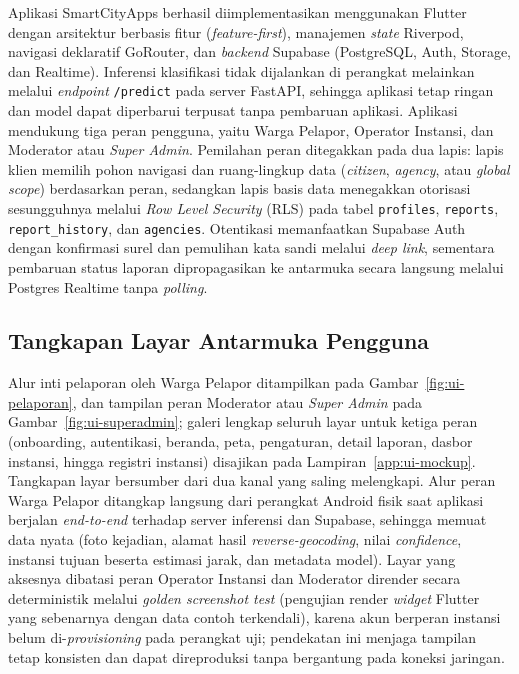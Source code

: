Aplikasi SmartCityApps berhasil diimplementasikan menggunakan Flutter dengan arsitektur berbasis fitur (\textit{feature-first}), manajemen \textit{state} Riverpod, navigasi deklaratif GoRouter, dan \textit{backend} Supabase (PostgreSQL, Auth, Storage, dan Realtime). Inferensi klasifikasi tidak dijalankan di perangkat melainkan melalui \textit{endpoint} \texttt{/predict} pada server FastAPI, sehingga aplikasi tetap ringan dan model dapat diperbarui terpusat tanpa pembaruan aplikasi. Aplikasi mendukung tiga peran pengguna, yaitu Warga Pelapor, Operator Instansi, dan Moderator atau \textit{Super Admin}. Pemilahan peran ditegakkan pada dua lapis: lapis klien memilih pohon navigasi dan ruang-lingkup data (\textit{citizen}, \textit{agency}, atau \textit{global scope}) berdasarkan peran, sedangkan lapis basis data menegakkan otorisasi sesungguhnya melalui \textit{Row Level Security} (RLS) pada tabel \texttt{profiles}, \texttt{reports}, \texttt{report\_history}, dan \texttt{agencies}. Otentikasi memanfaatkan Supabase Auth dengan konfirmasi surel dan pemulihan kata sandi melalui \textit{deep link}, sementara pembaruan status laporan dipropagasikan ke antarmuka secara langsung melalui Postgres Realtime tanpa \textit{polling}.

\subsection{Tangkapan Layar Antarmuka Pengguna}
\label{sec:ui-screenshots}

Alur inti pelaporan oleh Warga Pelapor ditampilkan pada Gambar~\ref{fig:ui-pelaporan}, dan tampilan peran Moderator atau \textit{Super Admin} pada Gambar~\ref{fig:ui-superadmin}; galeri lengkap seluruh layar untuk ketiga peran (onboarding, autentikasi, beranda, peta, pengaturan, detail laporan, dasbor instansi, hingga registri instansi) disajikan pada Lampiran~\ref{app:ui-mockup}. Tangkapan layar bersumber dari dua kanal yang saling melengkapi. Alur peran Warga Pelapor ditangkap langsung dari perangkat Android fisik saat aplikasi berjalan \textit{end-to-end} terhadap server inferensi dan Supabase, sehingga memuat data nyata (foto kejadian, alamat hasil \textit{reverse-geocoding}, nilai \textit{confidence}, instansi tujuan beserta estimasi jarak, dan metadata model). Layar yang aksesnya dibatasi peran Operator Instansi dan Moderator dirender secara deterministik melalui \textit{golden screenshot test} (pengujian render \textit{widget} Flutter yang sebenarnya dengan data contoh terkendali), karena akun berperan instansi belum di-\textit{provisioning} pada perangkat uji; pendekatan ini menjaga tampilan tetap konsisten dan dapat direproduksi tanpa bergantung pada koneksi jaringan.

